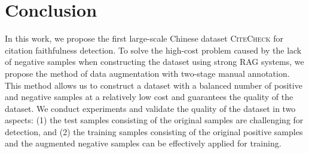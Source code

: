 \section{Conclusion}
 
In this work, we propose the first large-scale Chinese dataset \textsc{CiteCheck} for citation faithfulness detection. To solve the high-cost problem caused by the lack of negative samples when constructing the dataset using strong RAG systems, we propose the method of data augmentation with two-stage manual annotation. This method allows us to construct a dataset with a balanced number of positive and negative samples at a relatively low cost and guarantees the quality of the dataset. We conduct experiments and validate the quality of the dataset in two aspects: (1) the test samples consisting of the original samples are challenging for detection, and (2) the training samples consisting of the original positive samples and the augmented negative samples can be effectively applied for training.


